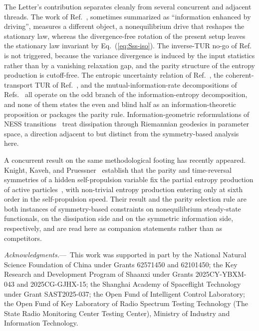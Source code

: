 \documentclass[%
 reprint,
 superscriptaddress,
 nofootinbib,
 nobibnotes,
 amsmath,amssymb,
 aps,
 prl,
 floatfix,
]{revtex4-2}
\newcommand{\plsection}[1]{\par\medskip\noindent\textit{#1.}---\,\ignorespaces}
\begin{document}
The Letter's contribution separates cleanly from several concurrent and adjacent threads. The work of Ref.~\cite{Entropy2024NEEnhance}, sometimes summarized as ``information enhanced by driving'', measures a different object, a nonequilibrium drive that reshapes the stationary law, whereas the divergence-free rotation of the present setup leaves the stationary law invariant by Eq.~(\ref{eq:Sss-iso}). The inverse-TUR no-go of Ref.~\cite{Vo2025} is not triggered, because the variance divergence is induced by the input statistics rather than by a vanishing relaxation gap, and the parity structure of the entropy production is cutoff-free. The entropic uncertainty relation of Ref.~\cite{Hasegawa2025}, the coherent-transport TUR of Ref.~\cite{BrandnerSaito2025}, and the mutual-information-rate decompositions of Refs.~\cite{Cho2025,Zeng2017} all operate on the odd branch of the information-entropy decomposition, and none of them states the even and blind half as an information-theoretic proposition or packages the parity rule. Information-geometric reformulations of NESS transitions~\cite{Ito2020,Lacerda2025} treat dissipation through Riemannian geodesics in parameter space, a direction adjacent to but distinct from the symmetry-based analysis here.

A concurrent result on the same methodological footing has recently appeared. Knight, Kaveh, and Pruessner~\cite{Knight2026} establish that the parity and time-reversal symmetries of a hidden self-propulsion variable fix the partial entropy production of active particles~\cite{Fodor2016}, with non-trivial entropy production entering only at sixth order in the self-propulsion speed. Their result and the parity selection rule are both instances of symmetry-based constraints on nonequilibrium steady-state functionals, on the dissipation side and on the symmetric information side, respectively, and are read here as companion statements rather than as competitors.

\plsection{Acknowledgments}%
This work was supported in part by the National Natural Science Foundation of China under Grants 62571450 and 62101450; the Key Research and Development Program of Shaanxi under Grants 2025CY-YBXM-043 and 2025CG-GJHX-15; the Shanghai Academy of Spaceflight Technology under Grant SAST2025-037; the Open Fund of Intelligent Control Laboratory; the Open Fund of Key Laboratory of Radio Spectrum Testing Technology (The State Radio Monitoring Center Testing Center), Ministry of Industry and Information Technology.



\end{document}
